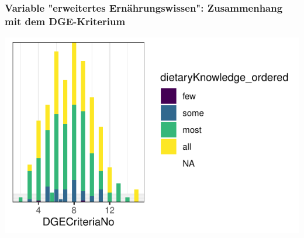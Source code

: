 \begin{frame}[fragile]
\frametitle{Variable "erweitertes Ernährungswissen": Zusammenhang mit dem DGE-Kriterium}
\begin{knitrout}\footnotesize
{}\color{fgcolor}\begin{kframe}


{\ttfamily\noindent\color{warningcolor}{\#\# Warning: Removed 244 rows containing missing values (position\_stack).}}\end{kframe}

{\centering \includegraphics[width=\maxwidth]{figure/beamer-dietaryDGEplot-1} 

}



\end{knitrout}
\end{frame} 

